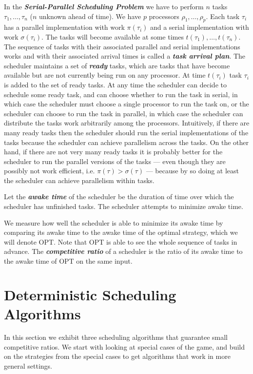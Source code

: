 \documentclass[twocolumn]{article}[11pt]
\newcommand{\defn}[1]{{\textit{\textbf{\boldmath #1}}}\xspace}
\begin{document}
In the \defn{Serial-Parallel Scheduling Problem} we have to
perform $n$ tasks $\tau_1, \ldots, \tau_n$ ($n$ unknown ahead of
time). We have $p$ processors $\rho_1, \ldots, \rho_p$. Each task
$\tau_i$ has a parallel implementation with work $\pi(\tau_i)$ and a
serial implementation with work $\sigma(\tau_i)$. The tasks will become
available at some times $t(\tau_1), \ldots, t(\tau_n)$. 
The sequence of tasks with their associated parallel and serial
implementations works and with their associated arrival times is
called a \defn{task arrival plan}.
The scheduler maintains a set of \defn{ready} tasks, which are tasks that have
become available but are not currently being run on any
processor. At time $t(\tau_i)$ task $\tau_i$ is added to the set of
ready tasks. At any time the scheduler can decide to schedule
some ready task, and can choose whether to run the task in
serial, in which case the scheduler must choose a single
processor to run the task on, or the scheduler can choose to run
the task in parallel, in which case the scheduler can distribute
the tasks work arbitrarily among the processors. Intuitively, if
there are many ready tasks then the scheduler should run the
serial implementations of the tasks because the scheduler can
achieve parallelism across the tasks. On the other hand, if there
are not very many ready tasks it is probably better for the
scheduler to run the parallel versions of the tasks --- even
though they are possibly not work efficient, i.e. $\pi(\tau) >
\sigma(\tau)$ --- because by so doing at least the scheduler can
achieve parallelism within tasks.

Let the \defn{awake time} of the scheduler be the duration of
time over which the scheduler has unfinished tasks.
The scheduler attempts to minimize awake time.

We measure how well the scheduler is able to minimize its awake
time by comparing its awake time to the awake time of the optimal
strategy, which we will denote OPT. Note that OPT is able to see
the whole sequence of tasks in advance.
The \defn{competitive ratio} of a scheduler is the ratio
of its awake time to the awake time of OPT on the same input.

\section{Deterministic Scheduling Algorithms}

In this section we exhibit three scheduling algorithms that
guarantee small competitive ratios. We start with looking at
special cases of the game, and build on the strategies from the
special cases to get algorithms that work in more general
settings.
\end{document}
